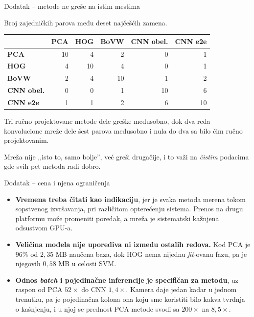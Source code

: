 \documentclass[aspectratio=169, 10pt]{beamer}
\newcommand{\uska}{\setlength{\tabcolsep}{4pt}\small}
\begin{document}
\begin{frame}{Dodatak -- metode ne greše na istim mestima}

Broj zajedničkih parova među deset najčešćih zamena.

\begin{center}
\uska
\begin{tabular}{lrrrrr}
\toprule
& \textbf{PCA} & \textbf{HOG} & \textbf{BoVW} & \textbf{CNN obel.} & \textbf{CNN e2e} \\
\midrule
\textbf{PCA}       & 10 & 4 & 2 & \alert{0} & 1 \\
\textbf{HOG}       & 4 & 10 & 4 & \alert{0} & 1 \\
\textbf{BoVW}      & 2 & 4 & 10 & 1 & 2 \\
\textbf{CNN obel.} & 0 & 0 & 1 & 10 & \alert{6} \\
\textbf{CNN e2e}   & 1 & 1 & 2 & 6 & 10 \\
\bottomrule
\end{tabular}
\end{center}

\vspace{0.35cm}
Tri ručno projektovane metode dele greške međusobno, dok dva reda konvolucione mreže dele
šest parova međusobno i \alert{nula do dva} sa bilo čim ručno projektovanim.

\vspace{0.2cm}
Mreža nije ,,isto to, samo bolje'', već \alert{greši drugačije}, i to važi na \emph{čistim}
podacima gde svih pet metoda radi dobro.

\end{frame}

\begin{frame}{Dodatak -- cena i njena ograničenja}

\begin{itemize}
  \item \textbf{Vremena treba čitati kao indikaciju}, jer je svaka metoda merena tokom
        sopstvenog izvršavanja, pri različitom opterećenju sistema. Prenos na drugu platformu
        može promeniti poredak, a mreža je sistematski kažnjena odsustvom GPU-a.
  \item \textbf{Veličina modela nije uporediva ni između ostalih redova.} Kod PCA je $96\%$ od
        $2{,}35$ MB naučena baza, dok HOG nema nijednu \textit{fit}-ovanu fazu, pa je njegovih
        $0{,}58$ MB u celosti SVM.
  \item \textbf{Odnos \textit{batch} i pojedinačne inferencije je specifičan za metodu}, uz
        raspon od PCA $52\times$ do CNN $1{,}4\times$. Kamera daje jedan kadar u jednom
        trenutku, pa je pojedinačna kolona ona koju sme koristiti bilo kakva tvrdnja o
        kašnjenju, i u njoj se prednost PCA metode svodi sa $200\times$ na $8{,}5\times$.
\end{itemize}

\end{frame}
\end{document}
